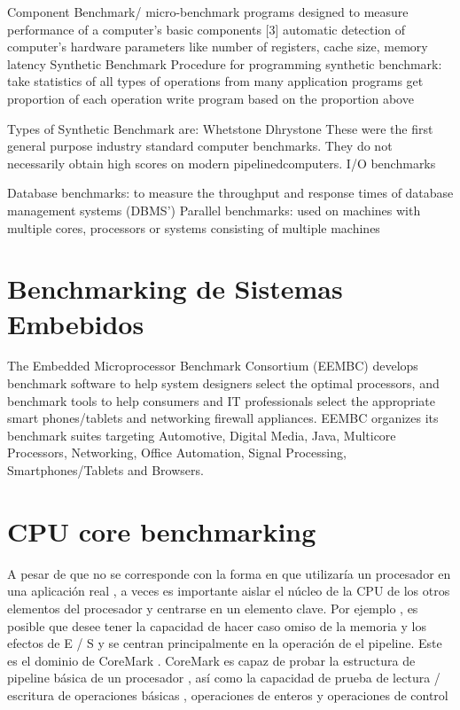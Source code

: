 	Component Benchmark/ micro-benchmark
		programs designed to measure performance of a computer's basic components [3]
		automatic detection of computer's hardware parameters like number of registers, cache size, memory latency
	Synthetic Benchmark
		Procedure for programming synthetic benchmark:
			take statistics of all types of operations from many application programs
			get proportion of each operation
			write program based on the proportion above
	
		Types of Synthetic Benchmark are:
			Whetstone
			Dhrystone
		These were the first general purpose industry standard computer benchmarks. They do not necessarily obtain high scores on modern pipelinedcomputers.
	I/O benchmarks
	
	Database benchmarks: to measure the throughput and response times of database management systems (DBMS')
	Parallel benchmarks: used on machines with multiple cores, processors or systems consisting of multiple machines
	
	\section{Benchmarking de Sistemas Embebidos}
	The Embedded Microprocessor Benchmark Consortium (EEMBC) develops benchmark software to help system designers select the optimal processors, and
	benchmark tools to help consumers and IT professionals select the appropriate smart phones/tablets and networking firewall appliances. EEMBC
	organizes its benchmark suites targeting Automotive, Digital Media, Java, Multicore Processors, Networking, Office Automation, Signal Processing,
	Smartphones/Tablets and Browsers.
 	
	\section{CPU core benchmarking}
 	A pesar de que no se corresponde con la forma en que utilizaría un procesador en una aplicación real , a veces es importante aislar el núcleo de la
 	CPU de los otros elementos del procesador y centrarse en un elemento clave. Por ejemplo , es posible que desee tener la capacidad de hacer caso
 	omiso de la memoria y los efectos de E / S y se centran principalmente en la operación de el pipeline. Este es el dominio de CoreMark . CoreMark es
 	capaz de probar la estructura de pipeline básica de un procesador , así como la capacidad de prueba de lectura / escritura de operaciones básicas ,
 	operaciones de enteros y operaciones de control

